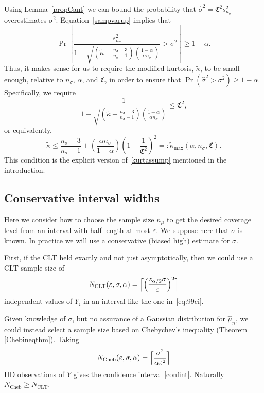 \documentclass[graybox]{svmult}
\newcommand{\fudge}{\mathfrak{C}}
\newcommand{\Prob}{\Pr}
\newcommand{\tkappa}{\tilde{\kappa}}
\begin{document}
Using Lemma~\ref{propCant} we can bound the probability
that $\hat\sigma^2 = \fudge^2 s^2_{n_\sigma}$ overestimates $\sigma^2$.
Equation~\eqref{sampvarup} implies that
\begin{equation*} %
\Prob \left[\frac{s^2_{n_{\sigma}}}{1 - \sqrt{\left ( \tilde\kappa  - \frac{n_{\sigma}-3}{n_{\sigma}-1}\right)\left(\frac{1-\alpha}{\alpha n_{\sigma}}\right)}} > \sigma^2 \right] \ge 1 - \alpha.
\end{equation*}
Thus, it makes sense for us to require the modified kurtosis, $\tkappa$, to be small enough, relative to $n_{\sigma}$, $\alpha$, and $\fudge$, in order to ensure 
that $\Pr(\hat\sigma^2 > \sigma^2) \ge 1-\alpha$. Specifically, we require
$$
\frac{1}{1 - \sqrt{\left ( \tilde\kappa  - \frac{n_{\sigma}-3}{n_{\sigma}-1}\right)\left(\frac{1-\alpha}{\alpha n_{\sigma}}\right)}} \le \fudge^2,
$$
or equivalently,
\begin{equation}
\label{kappamaxdef}
\tilde\kappa \le \frac{n_{\sigma}-3}{n_{\sigma}-1} + \left(\frac{ \alpha n_{\sigma}}{1-\alpha}\right) \left(1 - \frac{1}{\fudge^2}\right)^2 =: \tilde\kappa_{\max} (\alpha,n_{\sigma},\fudge). 
\end{equation}
This condition is the explicit version of \eqref{kurtassump} mentioned in the introduction.

\subsection{Conservative interval widths}

Here we consider how to choose the sample size
$n_\mu$ to get the desired coverage level
from an interval with half-length at most $\varepsilon$.
We suppose here that $\sigma$ is known.  
In practice we will use a conservative (biased high) estimate
for $\sigma$.

First, if the CLT held exactly and not just asymptotically,
then we could use a CLT sample size of
$$
N_{\mathrm{CLT}}(\varepsilon,\sigma,\alpha)
= 
\Bigl\lceil
\Bigl(
\frac{z_{\alpha/2}\sigma}{\varepsilon}
\Bigr)^2
\Bigr\rceil
$$
independent values of $Y_i$ in an interval
like the one in~\eqref{eq:99ci}.

Given knowledge of $\sigma$, but no assurance
of a Gaussian distribution for $\hat\mu_n$, we
could instead select a sample size based on
Chebychev's inequality (Theorem \ref{Chebineqthm}).  Taking
\begin{equation}\label{NCdef}
N_{\text{Cheb}}(\varepsilon,\sigma,\alpha)
= 
\Bigl\lceil\frac{\sigma^2}{\alpha\varepsilon^2}\Bigr\rceil
\end{equation}
IID observations of $Y$ gives the confidence interval \eqref{confint}.
Naturally $N_{\text{Cheb}}\ge N_{\text{CLT}}$.
\end{document}
